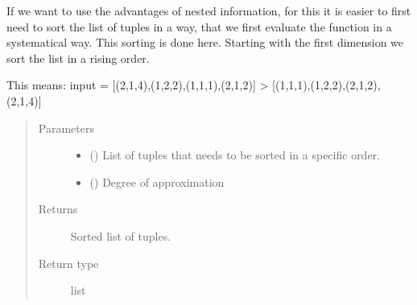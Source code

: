 \documentclass[letterpaper,10pt,english]{sphinxmanual}
\begin{document}
\begin{fulllineitems}
\label{\detokenize{index:Studienprojekt_Smolyak_qmc_one_point.sort_tuples}}
If we want to use the advantages of nested information, for this it is easier to first need to sort the list of
tuples in a way, that we first evaluate the function in a systematical way. This sorting is done here.
Starting  with the first dimension we sort the list in a rising order.

This means: input = {[}(2,1,4),(1,2,2),(1,1,1),(2,1,2){]} \textendash{}\textgreater{} {[}(1,1,1),(1,2,2),(2,1,2),(2,1,4){]}
\begin{quote}\begin{description}
\item[{Parameters}] \leavevmode\begin{itemize}
\item {} 
 () \textendash{} List of tuples that needs to be sorted in a specific order.

\item {} 
 () \textendash{} Degree of approximation

\end{itemize}

\item[{Returns}] \leavevmode
Sorted list of tuples.

\item[{Return type}] \leavevmode
list

\end{description}\end{quote}

\end{fulllineitems}

\end{document}
